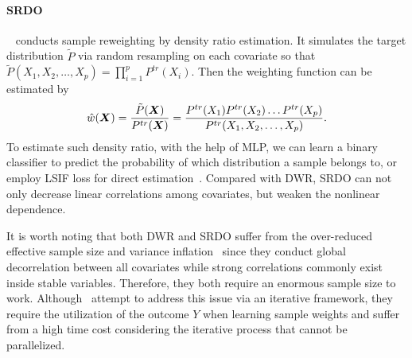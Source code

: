 \paragraph{SRDO}~\citep{shen2020stable} conducts sample reweighting by density ratio estimation. 
It simulates the target distribution $\tilde{P}$ via random resampling on each covariate so that $\tilde{P}(X_1, X_2, \dots, X_p) = \prod_{i=1}^p P^{tr}(X_i)$. 
Then the weighting function can be estimated by
\begin{equation} \label{eq:SRDO}
\small
    \hat{w}(\boldsymbol{X}) = \frac{\tilde{P}(\boldsymbol{X})}{P^{tr}(\boldsymbol{X})} =  \frac{P^{tr}(X_1)P^{tr}(X_2)\dots P^{tr}(X_p)}{P^{tr}(X_1, X_2, \dots, X_p)}.
\end{equation}
To estimate such density ratio, with the help of MLP, we can learn a binary classifier to predict the probability of which distribution a sample belongs to, or employ LSIF loss for direct estimation~\citep{menon2016linking}. 
Compared with DWR, SRDO can not only decrease linear correlations among covariates, but weaken the nonlinear dependence. 

It is worth noting that both DWR and SRDO suffer from the over-reduced effective sample size and variance inflation~\citep{shen2020stable2} since they conduct global decorrelation between all covariates while strong correlations commonly exist inside stable variables. Therefore, they both require an enormous sample size to work. Although~\citet{yu2023stable} attempt to address this issue via an iterative framework, they require the utilization of the outcome $Y$ when learning sample weights and suffer from a high time cost considering the iterative process that cannot be parallelized. 
